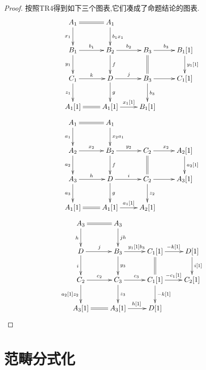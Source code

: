 \begin{enumerate}
\begin{proof}
    	按照$\mathrm{TR}4$得到如下三个图表,它们凑成了命题结论的图表.
    	$$\xymatrix{A_1\ar@{=}[r]\ar[d]_{x_1}&A_1\ar[d]^{b_1x_1}&&\\B_1\ar[r]^{b_1}\ar[d]_{y_1}&B_2\ar[r]^{b_2}\ar[d]^f&B_3\ar[r]^{b_3}\ar@{=}[d]&B_1[1]\ar[d]^{y_1[1]}\\C_1\ar[r]^k\ar[d]_{z_1}&D\ar[r]^j\ar[d]^g&B_3\ar[r]\ar[d]^{b_3}&C_1[1]\\A_1[1]\ar@{=}[r]&A_1[1]\ar[r]^{x_1[1]}&B_1[1]&}$$
    	$$\xymatrix{A_1\ar@{=}[r]\ar[d]_{a_1}&A_1\ar[d]^{x_2a_1}&&\\A_2\ar[r]^{x_2}\ar[d]_{a_2}&B_2\ar[r]^{y_2}\ar[d]^f&C_2\ar[r]^{x_2}\ar@{=}[d]&A_2[1]\ar[d]^{a_2[1]}\\A_3\ar[r]^h\ar[d]_{a_3}&D\ar[r]^i\ar[d]^g&C_2\ar[r]\ar[d]^{z_2}&A_3[1]\\A_1[1]\ar@{=}[r]&A_1[1]\ar[r]^{a_1[1]}&A_2[1]&}$$
    	$$\xymatrix{A_3\ar@{=}[r]\ar[d]_{h}&A_3\ar[d]^{jh}&&\\D\ar[r]^{j}\ar[d]_{i}&B_3\ar[r]^{y_1[1]b_3}\ar[d]^{y_3}&C_1[1]\ar[r]^{-k[1]}\ar@{=}[d]&D[1]\ar[d]^{i[1]}\\C_2\ar[r]^{c_2}\ar[d]_{a_2[1]z_2}&C_3\ar[r]^{c_3}\ar[d]^{z_3}&C_1[1]\ar[r]^{-c_1[1]}\ar[d]^{-k[1]}&C_2[1]\\A_3[1]\ar@{=}[r]&A_3[1]\ar[r]^{h[1]}&D[1]&}$$
    \end{proof}
\end{enumerate}



\newpage
\section{范畴分式化}


